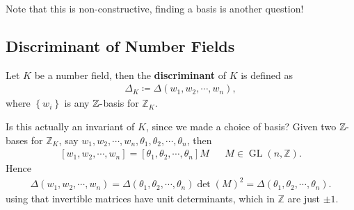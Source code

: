 \begin{remark}

Note that this is non-constructive, finding a basis is another question!

\end{remark}

\hypertarget{discriminant-of-number-fields}{%
\subsection{Discriminant of Number
Fields}\label{discriminant-of-number-fields}}

\begin{definition}

Let \(K\) be a number field, then the \textbf{discriminant} of \(K\) is
defined as
\begin{align*}
{\Delta}_K \coloneqq{\Delta}({ {w}_1, {w}_2, \cdots, {w}_{n}}) 
,\end{align*}
where \(\left\{{ w_i }\right\}\) is any \({\mathbb{Z}}{\hbox{-}}\)basis
for \({\mathbb{Z}}_K\).

\end{definition}

\begin{remark}

Is this actually an invariant of \(K\), since we made a choice of basis?
Given two \({\mathbb{Z}}{\hbox{-}}\)bases for \({\mathbb{Z}}_K\), say
\({ {w}_1, {w}_2, \cdots, {w}_{n}}, { {\theta }_1, {\theta }_2, \cdots, {\theta }_{n}}\),
then
\begin{align*}
{\left[ { { {w}_1, {w}_2, \cdots, {w}_{n}}} \right]} = {\left[ { { {\theta }_1, {\theta }_2, \cdots, {\theta }_{n}} } \right]} M && M \in \operatorname{GL}(n, {\mathbb{Z}})
.\end{align*}
Hence
\begin{align*}
{\Delta}({ {w}_1, {w}_2, \cdots, {w}_{n}}) 
= {\Delta}( { {\theta }_1, {\theta }_2, \cdots, {\theta }_{n}} ) \det(M)^2
= {\Delta}( { {\theta }_1, {\theta }_2, \cdots, {\theta }_{n}} )
.\end{align*}
using that invertible matrices have unit determinants, which in
\({\mathbb{Z}}\) are just \(\pm 1\).

\end{remark}

